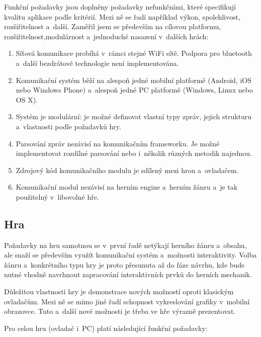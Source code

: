 \documentclass[thesis=B,czech,hidelinks]{FITthesis}[2012/06/26] %
\begin{document}
Funkční požadavky jsou doplněny požadavky nefunkčními, které specifikují kvalitu aplikace podle kritérií. Mezi ně se řadí například výkon, spolehlivost, rozšiřitelnost a~další. Zaměřil jsem se především na cílovou platformu, rozšiřitelnost,modulárnost a~jednoduché nasazení v~dalších hrách:

\begin{enumerate}
	\item Síťová komunikace probíhá v~rámci stejné WiFi sítě. Podpora pro bluetooth a~další bezdrátové technologie není implementována.
	\item Komunikační systém běží na alespoň jedné mobilní platformě (Android, iOS nebo Windows Phone) a~alespoň jedné PC platformě (Windows, Linux nebo OS X).
	\item Systém je modulární: je možné definovat vlastní typy zpráv, jejich strukturu a~vlastnosti podle požadavků hry.
	\item Parsování zpráv nezávisí na komunikačním frameworku. Je možné implementovat rozdílné parsování nebo i~několik různých metodik najednou.
	\item Zdrojový kód komunikačního modulu je sdílený mezi hrou a~ovladačem.
	\item Komunikační modul nezávisí na herním engine a~herním žánru a~je tak použitelný v~libovolné hře.
\end{enumerate}

\subsection{Hra}

Požadavky na hru samotnou se v~první řadě netýkají herního žánru a~obsahu, ale snaží se především využít komunikační systém a~možnosti interaktivity. Volba žánru a~konkrétního typu hry je proto přesunuta až do fáze návrhu, kde bude nutné vhodně navrhnout zapracování interaktivních prvků do herních mechanik.

Důležitou vlastností hry je demonstrace nových možností oproti klasickým ovladačům. Mezi ně se mimo jiné řadí schopnost vykreslování grafiky v~mobilní obrazovce. Tuto a~další nové možnosti je třeba ve hře 
výrazně prezentovat.

Pro celou hru (ovladač i~PC) platí následující funkční požadavky:
\end{document}
